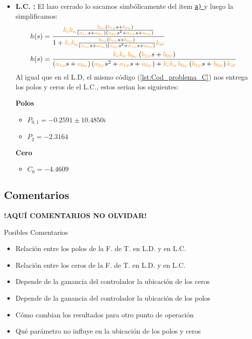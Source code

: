\begin{itemize}
    \item \textbf{L.C. :} El lazo cerrado lo sacamos simbólicamente del item \hyperref[pregunta-a]{\texttt{a)} } y luego la simplificamos:
    \begin{align*}
        &h(s) = \dfrac{\nara{k_ck_a} \frac{\nara{\nara{b_{0\omega}}}\left(\nara{b_{1\psi}}s + \nara{b_{0\psi}}\right)}
        {\left(\nara{a_{1\omega}}s + \nara{a_{0\omega}}\right)\left(\nara{a_{2\psi}}s^{2} + \nara{a_{1\psi}}s + \nara{a_{0\psi}}\right)}}{1+\nara{k_ck_a} \frac{\nara{\nara{b_{0\omega}}}\left(\nara{b_{1\psi}}s + \nara{b_{0\psi}}\right)}
        {\left(\nara{a_{1\omega}}s + \nara{a_{0\omega}}\right)\left(\nara{a_{2\psi}}s^{2} + \nara{a_{1\psi}}s + \nara{a_{0\psi}}\right)}\nara{k_{st}}} \\
        &h(s) = \dfrac{     \nara{k_ck_a}    \nara{\nara{b_{0\omega}}}\left(\nara{b_{1\psi}}s + \nara{b_{0\psi}}\right) }  {     \left(\nara{a_{1\omega}}s + \nara{a_{0\omega}}\right)\left(\nara{a_{2\psi}}s^{2} + \nara{a_{1\psi}}s + \nara{a_{0\psi}}\right)    + \nara{k_ck_a}     \nara{\nara{b_{0\omega}}}\left(\nara{b_{1\psi}}s + \nara{b_{0\psi}}\right)   
       \nara{k_{st}}}
    \end{align*}
    Al igual que en el L.D, el mismo código (\autoref{lst:Cod_problema_C}) nos entrega los polos y ceros de el L.C., estos serian los siguientes:
    \begin{multicols}{2}
        \textbf{Polos}
        \begin{itemize}
            \item \(P_{0,1} = -0.2591 \pm 10.4850i\) 
            \item \(P_2 = -2.3164 \)
        \end{itemize}
        \columnbreak
        \textbf{Cero}
        \begin{itemize}
            \item \(C_0 = -4.4609\)
        \end{itemize}
      \end{multicols}
\end{itemize}





\FloatBarrier
\subsection{Comentarios}


\textbf{!AQUÍ COMENTARIOS NO OLVIDAR!}

Posibles Comentarios
\begin{itemize}
    \item Relación entre los polos de la F. de T. en L.D. y en L.C.
    \item Relación entre los ceros de la F. de T. en L.D. y en L.C.
    \item Depende de la ganancia del controlador la ubicación de los ceros
    \item Depende de la ganancia del controlador la ubicación de los polos
    \item Cómo cambian los resultados para otro punto de operación
    \item Qué parámetro no influye en la ubicación de los polos y ceros
\end{itemize}